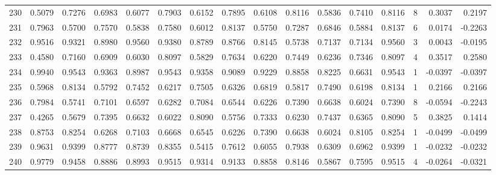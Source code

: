 \begin{tabular}{lrrrrrrrrrrrrrrr}
230 &      0.5079 &  0.7276 &  0.6983 &  0.6077 &  0.7903 &  0.6152 &  0.7895 &  0.6108 &  0.8116 &  0.5836 &   0.7410 &     0.8116 &      8 &                    0.3037 &                     0.2197 \\
231 &      0.7963 &  0.5700 &  0.7570 &  0.5838 &  0.7580 &  0.6012 &  0.8137 &  0.5750 &  0.7287 &  0.6846 &   0.5884 &     0.8137 &      6 &                    0.0174 &                    -0.2263 \\
232 &      0.9516 &  0.9321 &  0.8980 &  0.9560 &  0.9380 &  0.8789 &  0.8766 &  0.8145 &  0.5738 &  0.7137 &   0.7134 &     0.9560 &      3 &                    0.0043 &                    -0.0195 \\
233 &      0.4580 &  0.7160 &  0.6909 &  0.6030 &  0.8097 &  0.5829 &  0.7634 &  0.6220 &  0.7449 &  0.6236 &   0.7346 &     0.8097 &      4 &                    0.3517 &                     0.2580 \\
234 &      0.9940 &  0.9543 &  0.9363 &  0.8987 &  0.9543 &  0.9358 &  0.9089 &  0.9229 &  0.8858 &  0.8225 &   0.6631 &     0.9543 &      1 &                   -0.0397 &                    -0.0397 \\
235 &      0.5968 &  0.8134 &  0.5792 &  0.7452 &  0.6217 &  0.7505 &  0.6326 &  0.6819 &  0.5817 &  0.7490 &   0.6198 &     0.8134 &      1 &                    0.2166 &                     0.2166 \\
236 &      0.7984 &  0.5741 &  0.7101 &  0.6597 &  0.6282 &  0.7084 &  0.6544 &  0.6226 &  0.7390 &  0.6638 &   0.6024 &     0.7390 &      8 &                   -0.0594 &                    -0.2243 \\
237 &      0.4265 &  0.5679 &  0.7395 &  0.6632 &  0.6022 &  0.8090 &  0.5756 &  0.7333 &  0.6230 &  0.7437 &   0.6365 &     0.8090 &      5 &                    0.3825 &                     0.1414 \\
238 &      0.8753 &  0.8254 &  0.6268 &  0.7103 &  0.6668 &  0.6545 &  0.6226 &  0.7390 &  0.6638 &  0.6024 &   0.8105 &     0.8254 &      1 &                   -0.0499 &                    -0.0499 \\
239 &      0.9631 &  0.9399 &  0.8777 &  0.8739 &  0.8355 &  0.5415 &  0.7612 &  0.6055 &  0.7938 &  0.6309 &   0.6962 &     0.9399 &      1 &                   -0.0232 &                    -0.0232 \\
240 &      0.9779 &  0.9458 &  0.8886 &  0.8993 &  0.9515 &  0.9314 &  0.9133 &  0.8858 &  0.8146 &  0.5867 &   0.7595 &     0.9515 &      4 &                   -0.0264 &                    -0.0321 \\

\end{tabular}
